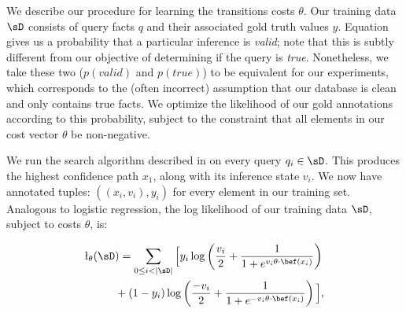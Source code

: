 We describe our procedure for learning the transitions costs $\theta$.
Our training data $\sD$ consists of query facts $q$ and their associated
  gold truth values $y$.
Equation  gives us a probability that a particular inference
  is \textit{valid}; note that this is subtly different from our objective of
  determining if the query is \textit{true}.
Nonetheless, we take these two ($p(\textit{valid})$ and $p(\textit{true})$) to be
  equivalent for our experiments, which corresponds to the (often
  incorrect) assumption that our database is clean and only contains
  true facts.
We optimize the likelihood of our gold annotations according to
  this probability, subject to
  the constraint that all elements in our cost vector $\theta$ be
  non-negative.

We run the search algorithm described in  on every
  query $q_i \in \sD$.
This produces the highest confidence path $x_1$, along with its
  inference state $v_i$.
We now have annotated tuples: $( (x_i, v_i), y_i )$ for every
  element in our training set.
Analogous to logistic regression, the log likelihood of our training
  data $\sD$, subject to costs $\theta$, is:

%

\vspace{-0.75em}
\begin{align*}
\l_\theta(\sD&) = \sum_{0 \leq i < |\sD|} \Big[
    y_i \log \left(\frac{v_i}{2} + \frac{1}{1 + e^{v_i \theta \cdot \bef(x_i)}} \right) \\
    &+ (1 - y_i) \log \left(\frac{-v_i}{2} + \frac{1}{1 + e^{-v_i \theta \cdot \bef(x_i)}} \right)
  \Big],
\end{align*}
\vspace{-1.0em}

